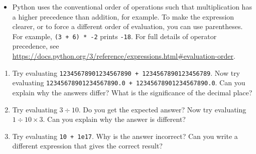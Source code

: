 \documentclass[a4paper,twoside]{memoir}
\makeatletter
\newcommand{\FrameTitle}[2]{%
  \fboxrule=\FrameRule \fboxsep=\FrameSep
  \fbox{\vbox{\nobreak \vskip -0.7\FrameSep
    \rlap{\centerline{\strut#1}}\nobreak\nointerlineskip%
    \vskip 0.7\FrameSep
    \hbox{#2}}}}
\newenvironment{framewithtitle}[2][\FrameFirst@Lab\ (cont.)]{%
  \def\FrameFirst@Lab{\textbf{#2}}%
  \def\FrameCont@Lab{\textbf{#1}}%
  \def\FrameCommand##1{%
    \FrameTitle{\FrameFirst@Lab}{##1}}%
  \def\FirstFrameCommand##1{%
    \FrameTitle{\FrameFirst@Lab}{##1}}%
  \def\MidFrameCommand##1{%
    \FrameTitle{\FrameCont@Lab}{##1}}%
  \def\LastFrameCommand##1{%
    \FrameTitle{\FrameCont@Lab}{##1}}%
\MakeFramed{\advance\hsize-\width \FrameRestore}}%
{\endMakeFramed}
\newcounter{exercisectr}
\newenvironment{exercise}
{\stepcounter{exercisectr}\begin{framewithtitle}{Practical \arabic{exercisectr}}}
{\end{framewithtitle}}
\newcommand{\shellcmd}{\texttt}
\makeatother
\begin{document}
\begin{itemize}
\item Python uses the conventional order of operations such that multiplication has a higher precedence than addition, for example.  To make the expression clearer, or to force a different order of evaluation, you can use parentheses.  For example, \shellcmd{(3 + 6) * -2} prints \shellcmd{-18}.  For full details of operator precedence, see \url{https://docs.python.org/3/reference/expressions.html#evaluation-order}.
\end{itemize}

\begin{exercise}
\begin{enumerate}
\item Try evaluating \shellcmd{12345678901234567890 + 1234567890123456789}.  Now try evaluating \shellcmd{12345678901234567890.0 + 12345678901234567890.0}.  Can you explain why the answers differ?  What is the significance of the decimal place?

\item Try evaluating $3 \div 10$.  Do you get the expected answer?  Now try evaluating $1 \div 10 \times 3$.  Can you explain why the answer is different?

\item Try evaluating \shellcmd{10 + 1e17}.  Why is the answer incorrect?  Can you write a different expression that gives the correct result? %
\end{enumerate}
\end{exercise}
\end{document}
